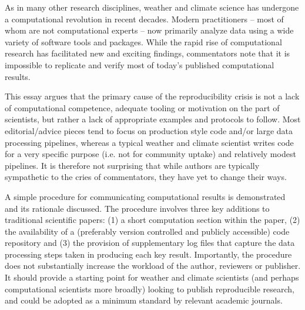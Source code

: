 As in many other research disciplines, weather and climate science has undergone a computational revolution in recent decades. Modern practitioners – most of whom are not computational experts – now primarily analyze data using a wide variety of software tools and packages. While the rapid rise of computational research has facilitated new and exciting findings, commentators note that it is impossible to replicate and verify most of today's published computational results.

This essay argues that the primary cause of the reproducibility crisis is not a lack of computational competence, adequate tooling or motivation on the part of scientists, but rather a lack of appropriate examples and protocols to follow. Most editorial/advice pieces tend to focus on production style code and/or large data processing pipelines, whereas a typical weather and climate scientist writes code for a very specific purpose (i.e. not for community uptake) and relatively modest pipelines. It is therefore not surprising that while authors are typically sympathetic to the cries of commentators, they have yet to change their ways.

A simple procedure for communicating computational results is demonstrated and its rationale discussed. The procedure involves three key additions to traditional scientific papers: (1) a short computation section within the paper, (2) the availability of a (preferably version controlled and publicly accessible) code repository and (3) the provision of supplementary log files that capture the data processing steps taken in producing each key result. Importantly, the procedure does not substantially increase the workload of the author, reviewers or publisher. It should provide a starting point for weather and climate scientists (and perhaps computational scientists more broadly) looking to publish reproducible research, and could be adopted as a minimum standard by relevant academic journals.